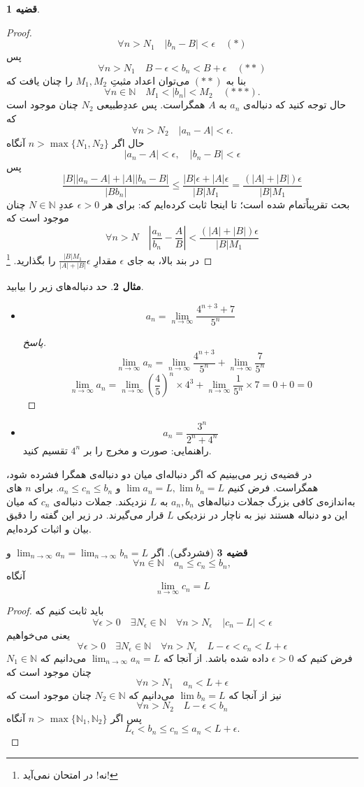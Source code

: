 \documentclass[12pt,a4paper]{article}
\theoremstyle{definition}
\newtheorem{thm}{قضیه}
\newtheorem{mesal}[thm]{مثال}
\begin{document}
\begin{thm}
\begin{enumerate}[a.]
\begin{proof}
\[
\forall n>N_1 \quad |b_n-B|<\epsilon \quad (*)
\]
پس
\[
\forall n>N_1 \quad B-\epsilon<b_n<B+\epsilon\quad (**)
\]
بنا به 
$(**)$
می‌توان اعداد مثبتِ
$M_1,M_2$
را چنان یافت که
\[
\forall n\in \mathbb{N}\quad  M_1<|b_n|<M_2 \quad (***).
\]
حال توجه کنید که دنباله‌ی
$a_n$
به 
$A$ 
همگراست. پس عددِطبیعی
$N_2$
چنان موجود است که
\[
\forall n>N_2 \quad |a_n-A|<\epsilon.
\]
حال اگر
$n>\max\{N_1,N_2\}$
آنگاه
\[
|a_n-A|<\epsilon, \quad |b_n-B|<\epsilon
\]
پس
\[
\frac{|B||a_n-A|+|A||b_n-B|}{|{Bb_n}|}\leq
\frac{|B|\epsilon+|A|\epsilon}{|B|M_1}=\frac{(|A|+|B|)\epsilon}{|B|M_1}
\]
بحث تقریباًتمام شده است؛
تا اینجا ثابت کرده‌ایم که:
\newline 
 برای هر
$\epsilon>0$
عددِ
$N\in \mathbb{N}$
چنان موجود است که 
\[
\forall n>N \quad |\frac{a_n}{b_n}-\frac{A}{B}|<\frac{(|A|+|B|)\epsilon}{|B|M_1}
\]
در بند بالا، به جای
$\epsilon$
مقدارِ
$\frac{|B|M_1}{|A|+|B|}\epsilon$
را بگذارید.
\footnote{نه! در امتحان نمی‌آید!}
\end{proof}
\end{enumerate}
\end{thm}
\begin{mesal}
حد دنباله‌های زیر را بیابید.
\begin{itemize}
\item
\[
a_n=\lim_{n \to \infty}\frac{4^{n+3}+7}{5^n}
\]
\begin{proof}[پاسخ]
\[
\lim_{n \to \infty}a_n = \lim_{n \to \infty}\frac{4^{n+3}}{5^n}+\lim_{n \to \infty}\frac{7}{5^n}
\]
\[
\lim_{n \to \infty}a_n = \lim_{n \to \infty}(\frac{4}{5})^n\times 4^3+\lim_{n \to \infty}\frac{1}{5^n}\times 7=0+0=0
\]
\end{proof}
\item
\[
a_n = \frac{3^n}{2^n+4^n}
\]
راهنمایی: صورت و مخرج را بر
$4^n$
تقسیم کنید.
\end{itemize}
\end{mesal}
در قضیه‌ی زیر می‌بینیم که اگر دنباله‌ای میان دو دنباله‌ی همگرا فشرده شود، همگراست. فرض کنیم
$\lim a_n=L, \lim b_n=L$
و
$a_n\leq c_n\leq b_n$.
برای 
$n$
های به‌اندازه‌ی کافی بزرگ جملات دنباله‌های
$a_n,b_n$
به 
$L$
نزدیکند. جملات دنباله‌ی
$c_n$
که میان این دو دنباله هستند نیز به ناچار در نزدیکی 
$L$
قرار می‌گیرند. در زیر این گفته را دقیق بیان و اثبات کرده‌ایم.
\begin{thm}[فشردگی]
اگر 
$\lim_{n\to \infty} a_n = \lim_{n\to \infty} b_n = L$
و 
\[
\forall n \in \mathbb{N} \quad a_n\leqslant c_n\leqslant b_n,
\]
آنگاه
\[
\lim_{n\to \infty} c_n =L
\]
\begin{proof}
باید ثابت کنیم که
\[
\forall \epsilon >0 \quad \exists N_\epsilon\in \mathbb{N} \quad \forall n>N_\epsilon \quad |c_n-L|<\epsilon
\]
یعنی می‌خواهیم
\[
\forall \epsilon >0 \quad \exists N_\epsilon\in \mathbb{N} \quad \forall n>N_\epsilon \quad L-\epsilon<c_n<L+\epsilon
\]
فرض کنیم که
$\epsilon>0$
داده شده باشد.
از آنجا که 
$\lim_{n\to \infty} a_n=L$
 می‌دانیم که 
$N_1\in \mathbb{N}$
چنان موجود است که 
\[
\forall n>N_1 \quad a_n<L+\epsilon
\]
نیز از آنجا که 
$\lim b_n=L$
می‌دانیم که 
$N_2\in \mathbb{N}$
چنان موجود است که 
\[
\forall n>N_2 \quad L-\epsilon<b_n
\]
پس اگر
$n>\max\{\mathbb{N}_1,\mathbb{N}_2\}$
آنگاه
\[
L_\epsilon<b_n\leq c_n\leq a_n<L+\epsilon.
\]
\end{proof}
\end{thm}
\end{document}
